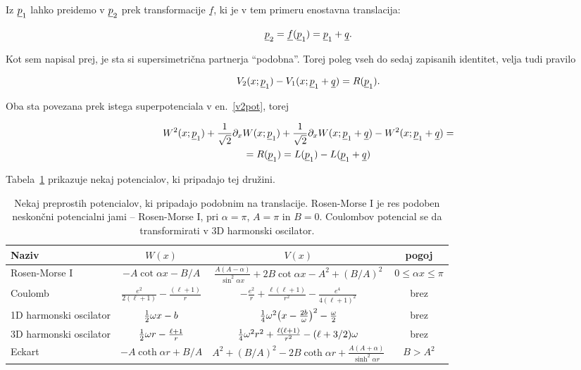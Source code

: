 Iz $\underline{p}_1$ lahko preidemo v $\underline{p}_2$ prek transformacije $\underline{f}$, ki je v tem primeru enostavna
translacija:

\[
	\underline{p}_2 = \underline{f}(\underline{p}_1) = \underline{p}_1 + \underline{q}.
\]

Kot sem napisal prej, je sta si supersimetri\v cna partnerja "`podobna"'. Torej poleg vseh do sedaj zapisanih
identitet, velja tudi pravilo

\begin{equation}
	V_2 (x; \underline{p}_1) - V_1 (x; \underline{p}_1 + \underline{q}) = R (\underline{p}_1).
\end{equation}

Oba sta povezana prek istega superpotenciala v en.~\eqref{v2pot}, torej

\begin{multline}
	W^2 (x; \underline{p}_1) + \frac{1}{\sqrt{2}}\partial_x W(x; \underline{p}_1) + \frac{1}{\sqrt{2}}\partial_x W (x; \underline{p}_1 + \underline{q}) - W^2
		(x; \underline{p}_1 + \underline{q}) =\\= R (\underline{p}_1) = L (\underline{p}_1) - L (\underline{p}_1 + \underline{q})
\end{multline}

Tabela~\ref{tab1} prikazuje nekaj potencialov, ki pripadajo tej dru\v zini.

\begin{table}[H]\centering
	\caption{Nekaj preprostih potencialov, ki pripadajo podobnim na translacije. Rosen-Morse I je res podoben
		neskon\v cni potencialni jami -- Rosen-Morse I, pri $\alpha = \pi$, $A = \pi$ in $B = 0$. Coulombov
		potencial se da transformirati v 3D harmonski oscilator.}
	\label{tab1}
	\vspace{0.2cm}
	\begin{tabular}{l || c | c | c}
		Naziv & $W(x)$ & $V(x)$ & pogoj\\ \hline
		Rosen-Morse I & $-A \cot \alpha x - B/A$ & $\frac{A (A - \alpha)}{\sin^2 \alpha x} + 2B\cot\alpha x - A^2
			+ (B/A)^2$ & $0 \leq \alpha x \leq \pi$ \\
		Coulomb & $\frac{e^2}{2(\ell+1)} - \frac{(\ell+1)}{r}$ & $-\frac{e^2}{r} + \frac{\ell(\ell+1)}{r^2} -
			\frac{e^4}{4(\ell + 1)^2}$ & brez \\
		1D harmonski oscilator & $\frac{1}{2}\omega x - b$ & $\frac{1}{4}\omega^2\big(x - \frac{2b}{\omega}\big)^2 - \frac{\omega}{2}$
			& brez \\
		3D harmonski oscilator & $\frac{1}{2}\omega r - \frac{\ell + 1}{r}$ & $\frac{1}{4}\omega^2r^2 +
			\frac{\ell(\ell + 1)}{r^2} - (\ell + 3/2)\omega$ & brez \\
		Eckart & $-A\coth\alpha r + B/A$ & $A^2 + (B/A)^2 - 2B\coth\alpha r + \frac{A(A + \alpha)}{\sinh^2 \alpha r}$
			& $B > A^2$ \\
	\end{tabular}
\end{table}


